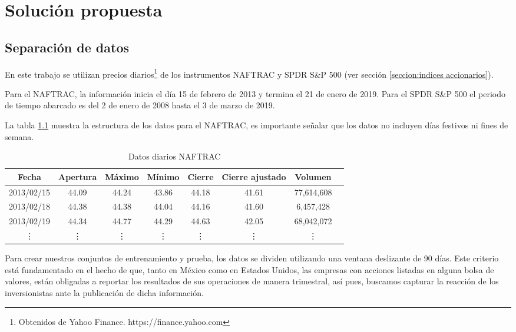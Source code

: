 \documentclass[12pt]{scrbook}
\theoremstyle{break}
\theoremstyle{break}
\begin{document}
\chapter{Solución propuesta}
\label{capitulo:solucion propuesta}

\section{Separación de datos}
\label{seccion:separacion de datos}
En este trabajo se utilizan precios diarios\footnote{Obtenidos de Yahoo Finance. https://finance.yahoo.com} de los instrumentos NAFTRAC y SPDR S\&P 500 (ver sección \ref{seccion:indices accionarios}).

Para el NAFTRAC, la información inicia el día 15 de febrero de 2013 y termina el 21 de enero de 2019. Para el SPDR S\&P 500 el periodo de tiempo abarcado es del 2 de enero de 2008 hasta  el 3 de marzo de 2019.

La tabla \ref{tabla:Ejemplo datos diarios NAFTRAC} muestra la estructura de los datos para el NAFTRAC, es importante señalar que los datos no incluyen días festivos ni fines de semana.

\begin{table}[h]
\centering
\begin{tabular}{cccccccc}
\hline
\textbf{Fecha} & \textbf{Apertura} & \textbf{Máximo} & \textbf{Mínimo} & \textbf{Cierre} & \textbf{Cierre ajustado} & \textbf{Volumen} \\
\hline
2013/02/15 & 44.09 & 44.24 & 43.86 & 44.18 & 41.61 & 77,614,608\\
2013/02/18 & 44.38 & 44.38 & 44.04 & 44.16 & 41.60 & 6,457,428\\
2013/02/19 & 44.34 & 44.77 & 44.29 & 44.63 & 42.05 & 68,042,072\\
\vdots & \vdots & \vdots & \vdots & \vdots & \vdots & \vdots \\
\hline
\end{tabular}
\caption{\label{tabla:Ejemplo datos diarios NAFTRAC} Datos diarios NAFTRAC}
\end{table}

Para crear nuestros conjuntos de entrenamiento y prueba, los datos se dividen utilizando una ventana deslizante de 90 días. Este criterio está fundamentado en el hecho de que, tanto en México como en Estados Unidos, las empresas con acciones listadas en alguna bolsa de valores, están obligadas a reportar los resultados de sus operaciones de manera trimestral, así pues, buscamos capturar la reacción de los inversionistas ante la publicación de dicha información.
\end{document}
